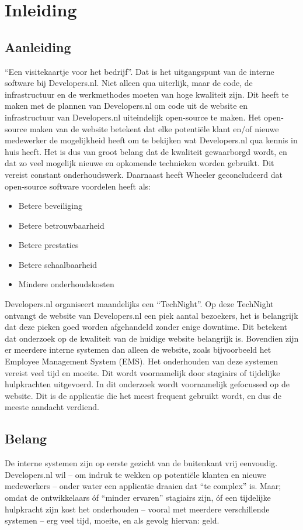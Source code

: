 \chapter{Inleiding}

\label{Chapter1}

\section{Aanleiding} \label{Aanleiding}
\enquote{Een visitekaartje voor het bedrijf}. Dat is het uitgangspunt van de interne software bij Developers.nl. Niet alleen qua uiterlijk, maar de code, de infrastructuur en de werkmethodes moeten van hoge kwaliteit zijn. Dit heeft te maken met de plannen van Developers.nl om code uit de website en infrastructuur van Developers.nl uiteindelijk open-source te maken. Het open-source maken van de website betekent dat elke potentiële klant en/of nieuwe medewerker de mogelijkheid heeft om te bekijken wat Developers.nl qua kennis in huis heeft. Het is dus van groot belang dat de kwaliteit gewaarborgd wordt, en dat zo veel mogelijk nieuwe en opkomende technieken worden gebruikt. Dit vereist constant onderhoudswerk. Daarnaast heeft Wheeler \parencite{WhyOpenSource} geconcludeerd dat open-source software voordelen heeft als:
\begin{itemize}
	\item Betere beveiliging
	\item Betere betrouwbaarheid 
	\item Betere prestaties
	\item Betere schaalbaarheid
	\item Mindere onderhoudskosten
\end{itemize}

Developers.nl organiseert maandelijks een \enquote{TechNight}. Op deze TechNight ontvangt de website van Developers.nl een piek aantal bezoekers, het is belangrijk dat deze pieken goed worden afgehandeld zonder enige downtime. Dit betekent dat onderzoek op de kwaliteit van de huidige website belangrijk is. Bovendien zijn er meerdere interne systemen dan alleen de website, zoals bijvoorbeeld het Employee Management System (EMS). Het onderhouden van deze systemen vereist veel tijd en moeite. Dit wordt voornamelijk door stagiairs of tijdelijke hulpkrachten uitgevoerd. In dit onderzoek wordt voornamelijk gefocussed op de website. Dit is de applicatie die het meest frequent gebruikt wordt, en dus de meeste aandacht verdiend.

\section{Belang}
De interne systemen zijn op eerste gezicht van de buitenkant vrij eenvoudig. Developers.nl wil -- om indruk te wekken op potentiële klanten en nieuwe medewerkers -- onder water een applicatie draaien dat \enquote{te complex} is. Maar; omdat de ontwikkelaars óf \enquote{minder ervaren} stagiairs zijn, óf een tijdelijke hulpkracht zijn kost het onderhouden -- vooral met meerdere verschillende systemen -- erg veel tijd, moeite, en als gevolg hiervan: geld.


